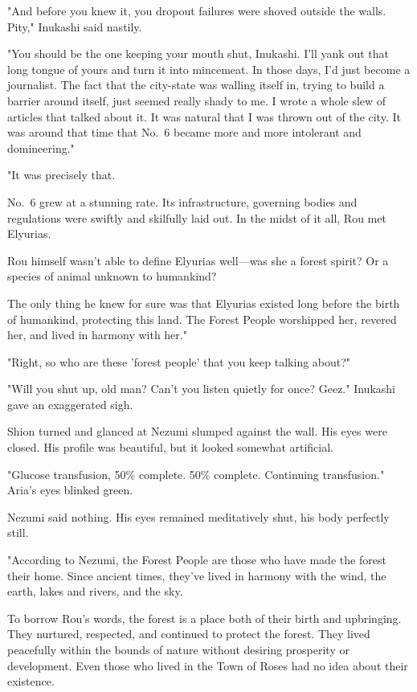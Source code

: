 "And before you knew it, you dropout failures were shoved outside the
walls. Pity," Inukashi said nastily.

"You should be the one keeping your mouth shut, Inukashi. I'll yank out
that long tongue of yours and turn it into mincemeat. In those days, I'd
just become a journalist. The fact that the city-state was walling
itself in, trying to build a barrier around itself, just seemed really
shady to me. I wrote a whole slew of articles that talked about it. It
was natural that I was thrown out of the city. It was around that time
that No.~6 became more and more intolerant and domineering."

"It was precisely that.

No.~6 grew at a stunning rate. Its infrastructure, governing bodies and
regulations were swiftly and skilfully laid out. In the midst of it all,
Rou met Elyurias.

Rou himself wasn't able to define Elyurias well---was she a forest spirit?
Or a species of animal unknown to humankind?

The only thing he knew for sure was that Elyurias existed long before
the birth of humankind, protecting this land. The Forest People
worshipped her, revered her, and lived in harmony with her."

"Right, so who are these 'forest people' that you keep talking about?"

"Will you shut up, old man? Can't you listen quietly for once? Geez."
Inukashi gave an exaggerated sigh.

Shion turned and glanced at Nezumi slumped against the wall. His eyes
were closed. His profile was beautiful, but it looked somewhat
artificial.

{\sffamily "Glucose transfusion, 50\% complete. 50\% complete. Continuing
transfusion."} Aria's eyes blinked green.

Nezumi said nothing. His eyes remained meditatively shut, his body
perfectly still.

\mybreak

"According to Nezumi, the Forest People are those who have made the
forest their home. Since ancient times, they've lived in harmony with
the wind, the earth, lakes and rivers, and the sky.

To borrow Rou's words, the forest is a place both of their birth and
upbringing. They nurtured, respected, and continued to protect the
forest. They lived peacefully within the bounds of nature without
desiring prosperity or development. Even those who lived in the Town of
Roses had no idea about their existence.

